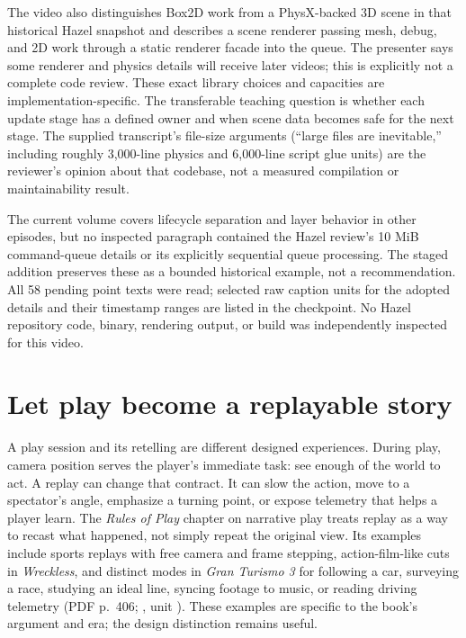 The video also distinguishes Box2D work from a PhysX-backed 3D scene in that historical Hazel snapshot and describes a scene renderer passing mesh, debug, and 2D work through a static renderer facade into the queue. The presenter says some renderer and physics details will receive later videos; this is explicitly not a complete code review. These exact library choices and capacities are implementation-specific. The transferable teaching question is whether each update stage has a defined owner and when scene data becomes safe for the next stage. The supplied transcript's file-size arguments (``large files are inevitable,'' including roughly 3,000-line physics and 6,000-line script glue units) are the reviewer's opinion about that codebase, not a measured compilation or maintainability result.

The current volume covers lifecycle separation and layer behavior in other episodes, but no inspected paragraph contained the Hazel review's 10 MiB command-queue details or its explicitly sequential queue processing. The staged addition preserves these as a bounded historical example, not a recommendation. All 58 pending point texts were read; selected raw caption units for the adopted details and their timestamp ranges are listed in the checkpoint. No Hazel repository code, binary, rendering output, or build was independently inspected for this video.

\section{Let play become a replayable story}\label{06-engine-ii-ch046-let-play-become-a-replayable-story}

\hypertarget{06-engine-ii-ch046-let-play-become-a-replayable-story}{}

A play session and its retelling are different designed experiences. During play, camera position serves the player's immediate task: see enough of the world to act. A replay can change that contract. It can slow the action, move to a spectator's angle, emphasize a turning point, or expose telemetry that helps a player learn. The \emph{Rules of Play} chapter on narrative play treats replay as a way to recast what happened, not simply repeat the original view. Its examples include sports replays with free camera and frame stepping, action-film-like cuts in \emph{Wreckless}, and distinct modes in \emph{Gran Turismo 3} for following a car, surveying a race, studying an ideal line, syncing footage to music, or reading driving telemetry (PDF p.~406; , unit ). These examples are specific to the book's argument and era; the design distinction remains useful.

